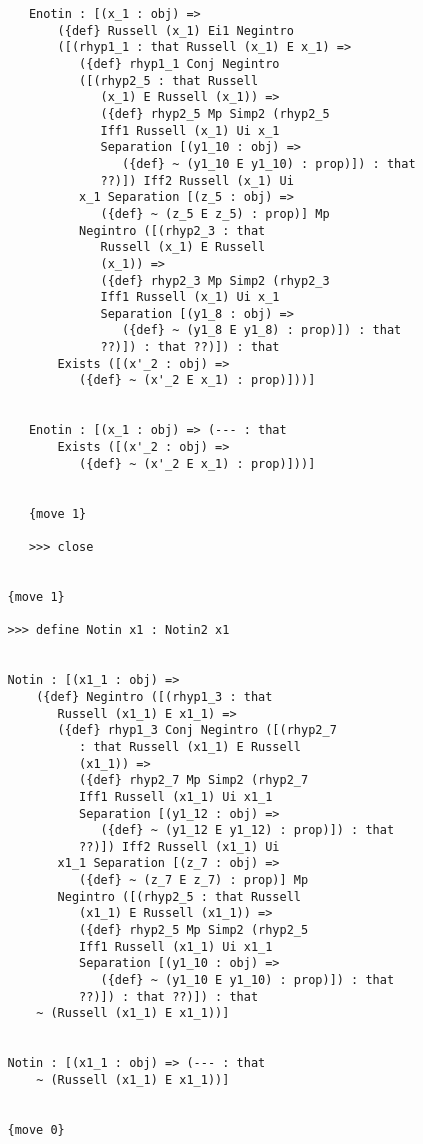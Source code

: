 \documentclass[12pt]{article}
\begin{document}
\begin{verbatim}
      Enotin : [(x_1 : obj) => 
          ({def} Russell (x_1) Ei1 Negintro 
          ([(rhyp1_1 : that Russell (x_1) E x_1) => 
             ({def} rhyp1_1 Conj Negintro 
             ([(rhyp2_5 : that Russell 
                (x_1) E Russell (x_1)) => 
                ({def} rhyp2_5 Mp Simp2 (rhyp2_5 
                Iff1 Russell (x_1) Ui x_1 
                Separation [(y1_10 : obj) => 
                   ({def} ~ (y1_10 E y1_10) : prop)]) : that 
                ??)]) Iff2 Russell (x_1) Ui 
             x_1 Separation [(z_5 : obj) => 
                ({def} ~ (z_5 E z_5) : prop)] Mp 
             Negintro ([(rhyp2_3 : that 
                Russell (x_1) E Russell 
                (x_1)) => 
                ({def} rhyp2_3 Mp Simp2 (rhyp2_3 
                Iff1 Russell (x_1) Ui x_1 
                Separation [(y1_8 : obj) => 
                   ({def} ~ (y1_8 E y1_8) : prop)]) : that 
                ??)]) : that ??)]) : that 
          Exists ([(x'_2 : obj) => 
             ({def} ~ (x'_2 E x_1) : prop)]))]


      Enotin : [(x_1 : obj) => (--- : that 
          Exists ([(x'_2 : obj) => 
             ({def} ~ (x'_2 E x_1) : prop)]))]


      {move 1}

      >>> close


   {move 1}

   >>> define Notin x1 : Notin2 x1


   Notin : [(x1_1 : obj) => 
       ({def} Negintro ([(rhyp1_3 : that 
          Russell (x1_1) E x1_1) => 
          ({def} rhyp1_3 Conj Negintro ([(rhyp2_7 
             : that Russell (x1_1) E Russell 
             (x1_1)) => 
             ({def} rhyp2_7 Mp Simp2 (rhyp2_7 
             Iff1 Russell (x1_1) Ui x1_1 
             Separation [(y1_12 : obj) => 
                ({def} ~ (y1_12 E y1_12) : prop)]) : that 
             ??)]) Iff2 Russell (x1_1) Ui 
          x1_1 Separation [(z_7 : obj) => 
             ({def} ~ (z_7 E z_7) : prop)] Mp 
          Negintro ([(rhyp2_5 : that Russell 
             (x1_1) E Russell (x1_1)) => 
             ({def} rhyp2_5 Mp Simp2 (rhyp2_5 
             Iff1 Russell (x1_1) Ui x1_1 
             Separation [(y1_10 : obj) => 
                ({def} ~ (y1_10 E y1_10) : prop)]) : that 
             ??)]) : that ??)]) : that 
       ~ (Russell (x1_1) E x1_1))]


   Notin : [(x1_1 : obj) => (--- : that 
       ~ (Russell (x1_1) E x1_1))]


   {move 0}


\end{verbatim}
\end{document}
